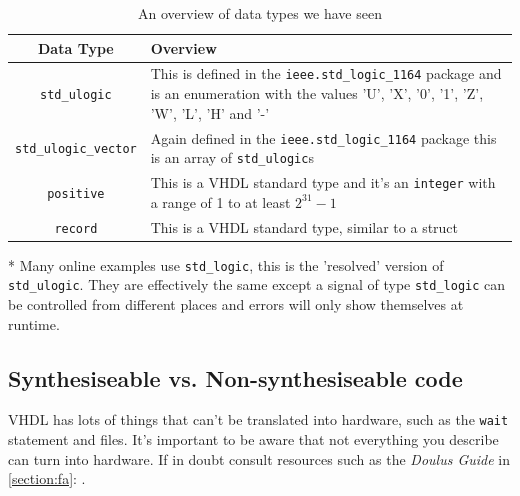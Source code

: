 \begin{table}[H]
    \begin{center}
    \begin{threeparttable}
        \begin{tabular}{| c | m{ } |}
            \hline
             Data Type & Overview \\ \hline
              \texttt{std\_ulogic}\tnote{*}& This is defined in the \texttt{ieee.std\_logic\_1164} package and is an enumeration with the values 'U', 'X', '0', '1', 'Z', 'W', 'L', 'H' and '-' \\ \hline
              \texttt{std\_ulogic\_vector} & Again defined in the  \texttt{ieee.std\_logic\_1164} package this is an array of \texttt{std\_ulogic}s \\ \hline
             \texttt{positive} & This is a VHDL standard type and it's an \texttt{integer} with a range of 1 to at least $2^{31} -1$  \\ \hline
              \texttt{record} & This is a VHDL standard type, similar to a struct \\ \hline
        \end{tabular}
        \begin{tablenotes}
        \footnotesize
        \item[*]Many online examples use  \texttt{std\_logic}, this is the 'resolved' version of  \texttt{std\_ulogic}. They are effectively the same except a signal of type \texttt{std\_logic} can be controlled from different places and errors will only show themselves at runtime.
        \end{tablenotes}
        \end{threeparttable}
        \caption{An overview of data types we have seen}
        \label{table:datatypes}
    \end{center}
\end{table}

\subsection{Synthesiseable vs. Non-synthesiseable code}
VHDL has lots of things that can't be translated into hardware, such as the \texttt{wait} statement and files. It's important to be aware that not everything you describe can turn into hardware. If in doubt consult resources such as the \emph{Doulus Guide} in \cref{section:fa}: .


